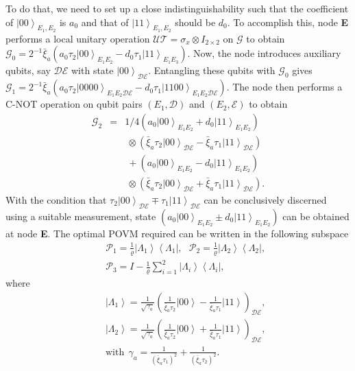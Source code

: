 \documentclass[aps,pra,twocolumn,showpacs,superscriptaddress,groupedaddress]{revtex4}
\begin{document}
To do that, we need to set up a close indistinguishability such that the coefficient of $\left|00\right\rangle_{E_1,E_2}$ is $a_0$ and that of $\left|11\right\rangle_{E_1,E_2}$ should be $d_0$. To accomplish this, node {\bf E} performs a local unitary operation $\mathcal{UT}=\sigma_x\otimes I_{2\times 2}$ on $\mathcal{G}$ to obtain $\mathcal{G}_0=2^{-1}\bar{\xi}_a(a_0\tau_2\left|00\right\rangle_{E_1E_2}-d_0\tau_1\left|11\right\rangle_{E_1E_3})$.  Now, the node introduces auxiliary qubits, say $\mathcal{DE}$ with state $\left|00\right\rangle_{\mathcal{DE}}$. Entangling these qubits with $\mathcal{G}_0$ gives $\mathcal{G}_1=2^{-1}\bar{\xi}_a(a_0\tau_2\left|0000\right\rangle_{E_1E_2\mathcal{DE}}-d_0\tau_1\left|1100\right\rangle_{E_1E_2\mathcal{DE}})$. The node then performs a C-NOT operation on qubit pairs $(E_1,\mathcal{D})$ and $(E_2,\mathcal{E})$ to obtain 
\begin{eqnarray}
\mathcal{G}_2&=&1/4\left(a_0\left|00\right\rangle_{E_1E_2}+d_0\left|11\right\rangle_{E_1E_2}\right)\nonumber\\
&&\ \otimes\left(\bar{\xi}_a\tau_2\left|00\right\rangle_{\mathcal{DE}}-\bar{\xi}_a\tau_1\left|11\right\rangle_{\mathcal{DE}}\right)\nonumber\\
&&\ +\left(a_0\left|00\right\rangle_{E_1E_2}-d_0\left|11\right\rangle_{E_1E_2}\right)\nonumber\\
&&\ \otimes\left(\bar{\xi}_a\tau_2\left|00\right\rangle_{\mathcal{DE}}+\bar{\xi}_a\tau_1\left|11\right\rangle_{\mathcal{DE}}\right).
\end{eqnarray}
With the condition that $\tau_2\left|00\right\rangle_{\mathcal{DE}}\mp\tau_1\left|11\right\rangle_{\mathcal{DE}}$ can be conclusively discerned using a suitable measurement, state $\left(a_0\left|00\right\rangle_{E_1E_2}\pm d_0\left|11\right\rangle_{E_1E_2}\right)$ can be obtained at node {\bf E}. The optimal POVM required can be written in the following subspace
\begin{eqnarray}
&&\mathcal{P}_1=\frac{1}{{\varrho}}\left|\Lambda_1\right\rangle\left\langle\Lambda_1\right|,\ \ \ \mathcal{P}_2=\frac{1}{{\varrho}}\left|\Lambda_2\right\rangle\left\langle\Lambda_2\right|,\nonumber\\
&&\mathcal{P}_3=I-\frac{1}{\varrho}\sum_{i=1}^2\left|\Lambda_i\right\rangle\left\langle\Lambda_i\right|\label{EQ4},
\end{eqnarray}
where
\begin{eqnarray}
&&\left|\Lambda_1\right\rangle=\frac{1}{\sqrt{\gamma_a}}\left(\frac{1}{\bar{\xi}_a\tau_2}\left|00\right\rangle-\frac{1}{\bar{\xi}_a\tau_1}\left|11\right\rangle\right)_{\mathcal{DE}},\nonumber\\
&&\left|\Lambda_2\right\rangle=\frac{1}{\sqrt{\gamma_a}}\left(\frac{1}{\bar{\xi}_a\tau_2}\left.|00\right\rangle+\frac{1}{\bar{\xi}_a\tau_1}\left|11\right\rangle\right)_{\mathcal{DE}},\nonumber\\
&&\mbox{with}\ \ \gamma_a=\frac{1}{\left(\bar{\xi}_a\tau_1\right)^2}+\frac{1}{\left(\bar{\xi}_a\tau_2\right)^2}.\label{EQ5}
\end{eqnarray}
\end{document}
